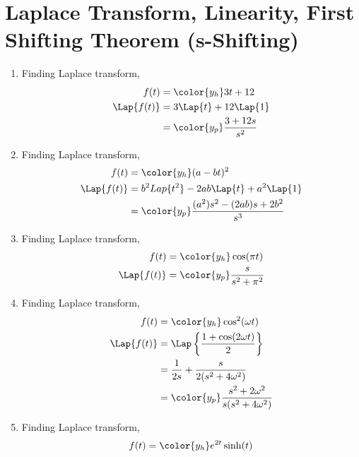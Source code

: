 \section{Laplace Transform, Linearity, First Shifting Theorem (s-Shifting)}

\begin{enumerate}
    \item Finding Laplace transform,
          \begin{align}
              f(t)         & = \color{y_h} 3t + 12             \\
              \Lap\{f(t)\} & = 3 \Lap \{t\} + 12 \Lap \{1\}    \\
                           & = \color{y_p} \frac{3 + 12s}{s^2}
          \end{align}
    \item Finding Laplace transform,
          \begin{align}
              f(t)         & = \color{y_h} (a-bt)^2                             \\
              \Lap\{f(t)\} & = b^2 Lap\{t^2\} - 2ab \Lap \{t\} + a^2 \Lap \{1\} \\
                           & = \color{y_p} \frac{(a^2)s^2 - (2ab)s + 2b^2}{s^3}
          \end{align}
    \item Finding Laplace transform,
          \begin{align}
              f(t)         & = \color{y_h} \cos(\pi t)           \\
              \Lap\{f(t)\} & = \color{y_p} \frac{s}{s^2 + \pi^2}
          \end{align}
    \item Finding Laplace transform,
          \begin{align}
              f(t)         & = \color{y_h} \cos^2(\omega t)                            \\
              \Lap\{f(t)\} & = \Lap\left\{ \frac{1 + \cos(2\omega t)}{2} \right\}      \\
                           & = \frac{1}{2s} + \frac{s}{2(s^2 + 4\omega^2)}             \\
                           & = \color{y_p}  \frac{s^2 + 2\omega^2}{s(s^2 + 4\omega^2)}
          \end{align}
    \item Finding Laplace transform,
          \begin{align}
              f(t)         & = \color{y_h} e^{2t}\sinh(t)                    \\

\end{align}
\end{enumerate}
